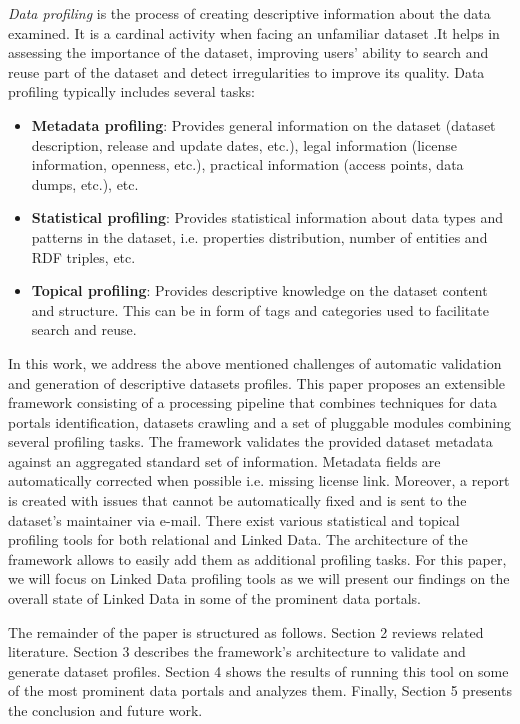 \documentclass[runningheads,a4paper]{llncs}
\begin{document}
\textit{Data profiling} is the process of creating descriptive information about the data examined. It is a cardinal activity when facing an unfamiliar dataset \cite{semwebprofiling}.It helps in assessing the importance of the dataset, improving users' ability to search and reuse part of the dataset and detect irregularities to improve its quality. Data profiling typically includes several tasks:
\begin{itemize}
  \item \textbf{Metadata profiling}: Provides general information on the dataset (dataset description, release and update dates, etc.), legal information (license information, openness, etc.), practical information (access points, data dumps, etc.), etc.
  \item \textbf{Statistical profiling}: Provides statistical information about data types and patterns in the dataset, i.e. properties distribution, number of entities and RDF triples, etc.
  \item \textbf{Topical profiling}: Provides descriptive knowledge on the dataset content and structure. This can be in form of tags and categories used to facilitate search and reuse.
\end{itemize}

In this work, we address the above mentioned challenges of automatic validation and generation of descriptive datasets profiles. This paper proposes an extensible framework consisting of a processing pipeline that combines techniques for data portals identification, datasets crawling and a set of pluggable modules combining several profiling tasks. The framework validates the provided dataset metadata against an aggregated standard set of information. Metadata fields are automatically corrected when possible i.e. missing license link. Moreover, a report is created with issues that cannot be automatically fixed and is sent to the dataset's maintainer via e-mail. There exist various statistical and topical profiling tools for both relational and Linked Data. The architecture of the framework allows to easily add them as additional profiling tasks. For this paper, we will focus on Linked Data profiling tools as we will present our findings on the overall state of Linked Data in some of the prominent data portals.

The remainder of the paper is structured as follows. Section 2 reviews related literature. Section 3 describes the framework's architecture to validate and generate dataset profiles. Section 4 shows the results of running this tool on some of the most prominent data portals and analyzes them. Finally, Section 5 presents the conclusion and future work.
\end{document}
